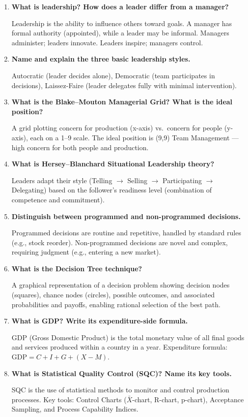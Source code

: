 \documentclass[12pt,a4paper]{article}
\newcommand{\Q}[1]{\textbf{#1}\par\noindent\ignorespaces}
\begin{document}
\begin{tcolorbox}[exambox, title={\textbf{Frequently Asked / Viva Questions}}]
\begin{enumerate}[topsep=0pt, label=\textbf{Q\arabic*.}, itemsep=5pt]
  \item \Q{What is leadership? How does a leader differ from a manager?}
    Leadership is the ability to influence others toward goals. A manager has formal authority (appointed), while a leader may be informal. Managers administer; leaders innovate. Leaders inspire; managers control.
  \item \Q{Name and explain the three basic leadership styles.}
    Autocratic (leader decides alone), Democratic (team participates in decisions), Laissez-Faire (leader delegates fully with minimal intervention).
  \item \Q{What is the Blake--Mouton Managerial Grid? What is the ideal position?}
    A grid plotting concern for production (x-axis) vs.\ concern for people (y-axis), each on a 1--9 scale. The ideal position is (9,9) Team Management --- high concern for both people and production.
  \item \Q{What is Hersey--Blanchard Situational Leadership theory?}
    Leaders adapt their style (Telling $\to$ Selling $\to$ Participating $\to$ Delegating) based on the follower's readiness level (combination of competence and commitment).
  \item \Q{Distinguish between programmed and non-programmed decisions.}
    Programmed decisions are routine and repetitive, handled by standard rules (e.g., stock reorder). Non-programmed decisions are novel and complex, requiring judgment (e.g., entering a new market).
  \item \Q{What is the Decision Tree technique?}
    A graphical representation of a decision problem showing decision nodes (squares), chance nodes (circles), possible outcomes, and associated probabilities and payoffs, enabling rational selection of the best path.
  \item \Q{What is GDP? Write its expenditure-side formula.}
    GDP (Gross Domestic Product) is the total monetary value of all final goods and services produced within a country in a year. Expenditure formula: $\text{GDP} = C + I + G + (X - M)$.
  \item \Q{What is Statistical Quality Control (SQC)? Name its key tools.}
    SQC is the use of statistical methods to monitor and control production processes. Key tools: Control Charts ($\bar{X}$-chart, R-chart, p-chart), Acceptance Sampling, and Process Capability Indices.

\end{enumerate}
\end{tcolorbox}
\end{document}
